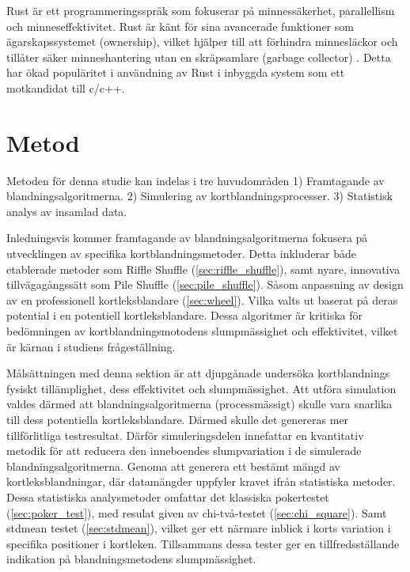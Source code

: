 \documentclass[swedish,a4paper]{article}
\begin{document}

Rust är ett programmeringsspråk som fokuserar på
minnessäkerhet, parallellism och minneseffektivitet. Rust är känt för
sina avancerade funktioner som ägarskapssystemet (ownership), vilket
hjälper till att förhindra minnesläckor och tillåter säker
minneshantering utan en skräpsamlare (garbage collector)
\parencite{rust}. Detta har ökad populäritet i användning av Rust i
inbyggda system som ett motkandidat till c/c++. 

\section{Metod} 
Metoden för denna studie kan indelas i tre huvudområden
1) Framtagande av  blandningsalgoritmerna. 
2) Simulering av kortblandningsprocesser. 
3) Statistisk analys av insamlad data.

Inledningsvis kommer framtagande av blandningsalgoritmerna fokusera på
utvecklingen av specifika kortblandningsmetoder. Detta inkluderar både
etablerade metoder som Riffle Shuffle (\ref{sec:riffle_shuffle}), samt nyare,
innovativa tillvägagångssätt som Pile Shuffle (\ref{sec:pile_shuffle}). Såsom
anpassning av design av en professionell kortleksblandare (\ref{sec:wheel}).
Vilka valts ut baserat på deras potential i en potentiell kortleksblandare.
Dessa algoritmer är kritiska för bedömningen av kortblandningsmotodens
slumpmässighet och effektivitet, vilket är kärnan i studiens frågeställning. 

Målsättningen med denna sektion är att djupgånade undersöka kortblandnings
fysiskt tillämplighet, dess effektivitet och slumpmässighet. Att utföra 
simulation valdes därmed att blandningsalgoritmerna
(processmässigt) skulle vara snarlika till dess potentiella kortleks\-blandare.
Därmed skulle det genereras mer tillförlitliga testresultat. Därför simuleringsdelen
innefattar en kvantitativ metodik för att reducera den inneboendes
slumpvariation i de simulerade blandningsalgoritmerna. Genoma att generera ett bestämt
mängd av kortleksblandningar, där datamängder uppfyler kravet ifrån statistiska metoder. Dessa
statistiska  analysmetoder omfattar det klassiska pokertestet (\ref{sec:poker_test}), med
resulat given av chi-två-testet (\ref{sec:chi_square}). Samt \gls{stdmean} testet
(\ref{sec:stdmean}), vilket ger ett närmare inblick i korts variation i specifika
positioner i kortleken. Tillsammans dessa tester ger en tillfredsställande indikation på
blandningsmetodens slumpmässighet. 
\end{document}
